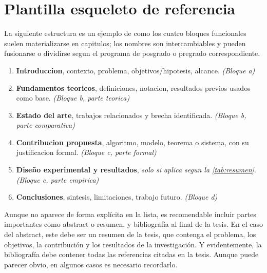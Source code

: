 \documentclass[11pt]{article}
\begin{document}
\section{Plantilla esqueleto de referencia}

La siguiente estructura es un ejemplo de como los cuatro bloques
funcionales suelen materializarse en capitulos; los nombres son
intercambiables y pueden fusionarse o dividirse segun el programa de
posgrado o pregrado correspondiente.

\begin{enumerate}
  \item \textbf{Introduccion}, contexto, problema, objetivos/hipotesis,
  alcance. \textit{(Bloque a)}
  \item \textbf{Fundamentos teoricos}, definiciones, notacion, resultados
  previos usados como base. \textit{(Bloque b, parte teorica)}
  \item \textbf{Estado del arte}, trabajos relacionados y brecha
  identificada. \textit{(Bloque b, parte comparativa)}
  \item \textbf{Contribucion propuesta}, algoritmo, modelo, teorema o
  sistema, con su justificacion formal. \textit{(Bloque c, parte
  formal)}
  \item \textbf{Diseño experimental y resultados}, \emph{solo si aplica
  segun la \cref{tab:resumen}}. \textit{(Bloque c, parte empirica)}
  \item \textbf{Conclusiones}, sintesis, limitaciones, trabajo futuro.
  \textit{(Bloque d)}

\end{enumerate}

Aunque no aparece de forma explícita en la lista, es recomendable incluir 
partes importantes como abstract o resumen, y bibliografía al final de la tesis. 
En el caso del abstract, este debe ser un resumen de la tesis, que contenga el problema,
los objetivos, la contribución y los resultados de la investigación. Y evidentemente, 
la bibliografía debe contener todas las referencias citadas en la tesis. Aunque 
puede parecer obvio, en algunos casos es necesario recordarlo.
\end{document}
